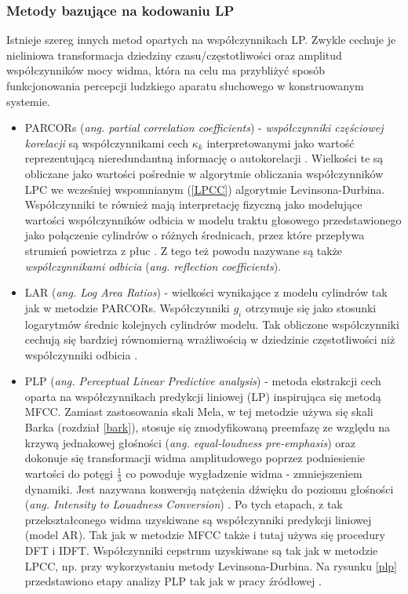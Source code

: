 \subsubsection{Metody bazujące na kodowaniu LP}
Istnieje szereg innych metod opartych na współczynnikach LP. Zwykle cechuje je nieliniowa transformacja dziedziny czasu/częstotliwości oraz amplitud współczynników mocy widma, która na celu ma przybliżyć sposób funkcjonowania percepcji ludzkiego aparatu słuchowego w konstruowanym systemie. 
\begin{itemize}
  \item{PARCORs (\textit{ang. partial correlation coefficients})} - \textit{współczynniki częściowej korelacji} są współczynnikami cech $\kappa_k$ interpretowanymi jako wartość reprezentującą nieredundantną informację o autokorelacji \cite{fosr}. Wielkości te są obliczane jako wartości pośrednie w algorytmie obliczania współczynników LPC we wcześniej wspomnianym (\ref{LPCC}) algorytmie Levinsona-Durbina. Współczynniki te również mają interpretację fizyczną jako modelujące wartości współczynników odbicia w modelu traktu głosowego przedstawionego jako połączenie cylindrów o różnych średnicach, przez które przepływa strumień powietrza z płuc \cite{fosr}. Z tego też powodu nazywane są także \textit{współczynnikami odbicia} (\textit{ang. reflection coefficients}).

  \item{LAR (\textit{ang. Log Area Ratios})} - wielkości wynikające z modelu cylindrów tak jak w metodzie PARCORs. Współczynniki $ g_i $ otrzymuje się jako stosunki logarytmów średnic kolejnych cylindrów modelu. Tak obliczone współczynniki cechują się bardziej równomierną wrażliwością w dziedzinie częstotliwości niż współczynniki odbicia \cite{campbell}.

  \item{PLP (\textit{ang. Perceptual Linear Predictive analysis})\label{plp}} - metoda ekstrakcji cech oparta na współczynnikach predykcji liniowej (LP) inspirująca się metodą MFCC. Zamiast zastosowania skali Mela, w tej metodzie używa się skali Barka (rozdział \ref{bark}), stosuje się zmodyfikowaną preemfazę ze względu na krzywą jednakowej głośności (\textit{ang. equal-loudness pre-emphasis}) oraz dokonuje się transformacji widma amplitudowego poprzez podniesienie wartości do potęgi $\frac{1}{3}$ co powoduje wygładzenie widma - zmniejszeniem dynamiki. Jest nazywana konwersją natężenia dźwięku do poziomu głośności (\textit{ang. Intensity to Louadness Conversion}) \cite{hoening}. Po tych etapach, z tak przekształconego widma uzyskiwane są współczynniki predykcji liniowej (model AR). Tak jak w metodzie MFCC także i tutaj używa się procedury DFT i IDFT. Współczynniki cepstrum uzyskiwane są tak jak w metodzie LPCC, np. przy wykorzystaniu metody Levinsona-Durbina. Na rysunku \ref{plp} przedstawiono etapy analizy PLP tak jak w pracy źródłowej \cite{fosr30hermansky}.


\end{itemize}
